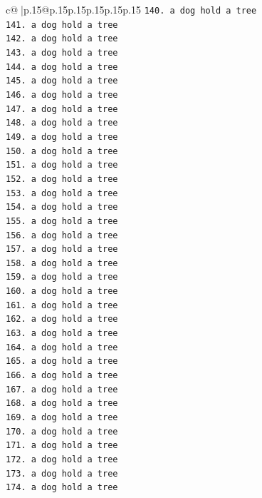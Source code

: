 \documentclass{article}
\begin{document}
{\begin{supertabular}{c@{$\;$}|p{.15\linewidth}@{}p{.15\linewidth}p{.15\linewidth}p{.15\linewidth}p{.15\linewidth}p{.15\linewidth}}
{{{\texttt{140. a dog hold a tree} \\
\texttt{141. a dog hold a tree} \\
\texttt{142. a dog hold a tree} \\
\texttt{143. a dog hold a tree} \\
\texttt{144. a dog hold a tree} \\
\texttt{145. a dog hold a tree} \\
\texttt{146. a dog hold a tree} \\
\texttt{147. a dog hold a tree} \\
\texttt{148. a dog hold a tree} \\
\texttt{149. a dog hold a tree} \\
\texttt{150. a dog hold a tree} \\
\texttt{151. a dog hold a tree} \\
\texttt{152. a dog hold a tree} \\
\texttt{153. a dog hold a tree} \\
\texttt{154. a dog hold a tree} \\
\texttt{155. a dog hold a tree} \\
\texttt{156. a dog hold a tree} \\
\texttt{157. a dog hold a tree} \\
\texttt{158. a dog hold a tree} \\
\texttt{159. a dog hold a tree} \\
\texttt{160. a dog hold a tree} \\
\texttt{161. a dog hold a tree} \\
\texttt{162. a dog hold a tree} \\
\texttt{163. a dog hold a tree} \\
\texttt{164. a dog hold a tree} \\
\texttt{165. a dog hold a tree} \\
\texttt{166. a dog hold a tree} \\
\texttt{167. a dog hold a tree} \\
\texttt{168. a dog hold a tree} \\
\texttt{169. a dog hold a tree} \\
\texttt{170. a dog hold a tree} \\
\texttt{171. a dog hold a tree} \\
\texttt{172. a dog hold a tree} \\
\texttt{173. a dog hold a tree} \\
\texttt{174. a dog hold a tree} \\
}}}
\end{supertabular}}
\end{document}
